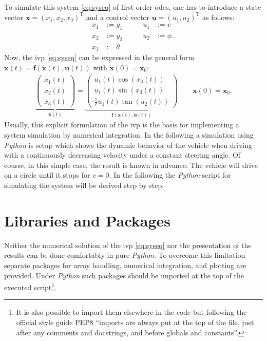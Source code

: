 \documentclass[a4paper,11pt,headinclude=true,headsepline,parskip=half,DIV=13]{scrartcl}
\newcommand{\py}{\emph{Python}\xspace}
\newcommand{\uu}{\mathbf{u}}
\newcommand{\f}{\mathbf{f}}
\newcommand{\x}{\mathbf{x}}
\newcommand{\xZero}{\mathbf{x}_0}
\begin{document}
To simulate this system \eqref{eq:syseq} of first order \glspl{ode}, one has to introduce a state vector $\x=(x_1,x_2,x_3)^\mathrm{T}$ and a control vector $\uu=(u_1,u_2)^\mathrm{T}$ as follows:
\begin{subequations}
\begin{alignat}{2}
x_1 &:= y_1 &\qquad u_1 &:= v\\
x_2 &:= y_2 &\qquad  u_2 &:= \phi \:. \\
x_3 &:= \theta
\end{alignat}
\end{subequations}
Now, the \gls{ivp} \eqref{eq:syseq} can be expressed in the general form $\dot{\x}(t)=\f(\x(t),\uu(t))$ with $\x(0) = \xZero$:
\label{eq:ss_system}
\begin{align} \label{eq:odesys}
\underbrace{\begin{pmatrix} \dot{x}_1(t) \\ \dot{x}_2(t) \\ \dot{x}_3(t) \end{pmatrix}}_{\dot{\x}(t)} = \underbrace{\begin{pmatrix}  u_1(t) \cos(x_3(t)) \\ u_1(t) \sin(x_3(t)) \\ \frac{1}{l}u_1(t) \tan(u_2(t)) \end{pmatrix}}_{\f(\x(t),\uu(t))} \qquad \x(0) = \xZero.
\end{align}
Usually, this explicit formulation of the \gls{ivp} is the basis for implementing a system simulation by numerical integration. In the following a simulation using \py is setup which shows the dynamic behavior of the vehicle when driving with a continuously decreasing velocity under a constant steering angle. Of course, in this simple case, the result is known in advance: The vehicle will drive on a circle until it stops for $v = 0$. In the following the \py-script for simulating the system will be derived step by step.


\section{Libraries and Packages}
Neither the numerical solution of the \gls{ivp} \eqref{eq:syseq} nor the presentation of the results can be done comfortably in pure \py. To overcome this limitation separate packages for array handling, numerical integration, and plotting are provided. Under \py such packages should be imported at the top of the executed script\footnote{It is also possible to import them elsewhere in the code but following the official style guide PEP8 ``imports are always put at the top of the file, just after any comments and docstrings, and before globals and constants''.}.
\end{document}
